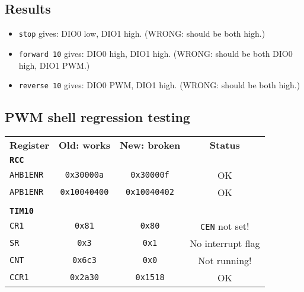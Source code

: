 \documentclass[a4paper,11pt]{article}
\begin{document}
\subsection*{Results}

\begin{itemize}
  \item{\texttt{stop} gives: DIO0 low, DIO1 high. (WRONG: should be
    both high.)}
    \item{\texttt{forward 10} gives: DIO0 high, DIO1 high. (WRONG: should be
    both DIO0 high, DIO1 PWM.)}
    \item{\texttt{reverse 10} gives: DIO0 PWM, DIO1 high. (WRONG: should be
    both high.)}
\end{itemize}

\subsection{PWM shell regression testing}

\begin{center}
  \begin{tabular}{lccc}
    \textbf{Register} & \textbf{Old: works} & \textbf{New: broken} & \textbf{Status} \\
    \textbf{\texttt{RCC}} \\
    \texttt{AHB1ENR} & \texttt{0x30000a} & \texttt{0x30000f} & OK \\
    \texttt{APB1ENR} & \texttt{0x10040400} & \texttt{0x10040402} & OK \\
    \\
    \textbf{\texttt{TIM10}} \\
    \texttt{CR1}  & \texttt{0x81} & \texttt{0x80} & \texttt{CEN} not set! \\
    \texttt{SR}   & \texttt{0x3} & \texttt{0x1} & No interrupt flag \\
    \texttt{CNT}  & \texttt{0x6c3} & \texttt{0x0} & Not running! \\
    \texttt{CCR1} & \texttt{0x2a30} & \texttt{0x1518} & OK
  \end{tabular}
\end{center}
\end{document}
